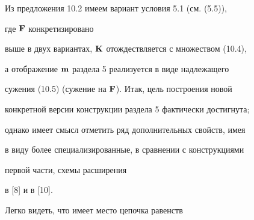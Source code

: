 




\begin{notes}


Из предложения 10.2 имеем вариант условия 5.1 (см. (5.5)),


где ${\bold F}$ конкретизировано


выше в двух вариантах, ${\bold K}$ отождествляется с множеством (10.4),


а отображение ${\bold m}$ раздела 5 реализуется в виде надлежащего


сужения (10.5) (сужение на ${\bold F}$). Итак, цель построения новой


конкретной версии конструкции раздела 5 фактически достигнута;


однако имеет смысл отметить ряд дополнительных свойств, имея


в виду более специализированные, в сравнении с конструкциями


первой части, схемы расширения


в [8] и в [10].


\end{notes}





Легко видеть, что имеет место цепочка равенств


$$


